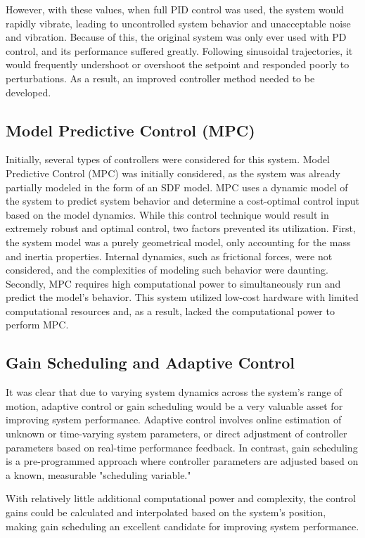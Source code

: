 However, with these values, when full PID control was used, the system would rapidly vibrate, leading to uncontrolled system behavior and unacceptable noise and vibration. Because of this, the original system was only ever used with PD control, and its performance suffered greatly. Following sinusoidal trajectories, it would frequently undershoot or overshoot the setpoint and responded poorly to perturbations. As a result, an improved controller method needed to be developed.


\subsection{Model Predictive Control (MPC)}

Initially, several types of controllers were considered for this system. Model Predictive Control (MPC) was initially considered, as the system was already partially modeled in the form of an SDF model. MPC uses a dynamic model of the system to predict system behavior and determine a cost-optimal control input based on the model dynamics. While this control technique would result in extremely robust and optimal control, two factors prevented its utilization. First, the system model was a purely geometrical model, only accounting for the mass and inertia properties. Internal dynamics, such as frictional forces, were not considered, and the complexities of modeling such behavior were daunting. Secondly, MPC requires high computational power to simultaneously run and predict the model's behavior. This system utilized low-cost hardware with limited computational resources and, as a result, lacked the computational power to perform MPC.

\subsection{Gain Scheduling and Adaptive Control}

It was clear that due to varying system dynamics across the system's range of motion, adaptive control or gain scheduling would be a very valuable asset for improving system performance. Adaptive control involves online estimation of unknown or time-varying system parameters, or direct adjustment of controller parameters based on real-time performance feedback. In contrast, gain scheduling is a pre-programmed approach where controller parameters are adjusted based on a known, measurable "scheduling variable."

With relatively little additional computational power and complexity, the control gains could be calculated and interpolated based on the system's position, making gain scheduling an excellent candidate for improving system performance.

